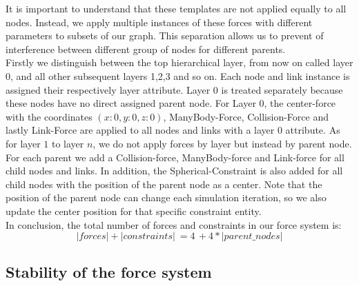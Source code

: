 It is important to understand that these templates are not applied equally to all nodes. Instead, we apply multiple instances of these forces with different parameters to subsets of our graph. 
This separation allows us to prevent of interference between different group of nodes for different parents.\\ 
Firstly we distinguish between the top hierarchical layer, from now on called layer $0$, and all other subsequent layers 1,2,3 and so on. Each node and link instance is assigned their respectively layer attribute. Layer $0$ is treated separately because these nodes have no direct assigned parent node. 
For Layer $0$, the center-force with the coordinates $(x:0,y:0,z:0)$, ManyBody-Force, Collision-Force and lastly Link-Force are applied to all nodes and links with a layer $0$ attribute. 
As for layer $1$ to layer $n$, we do not apply forces by layer but instead by parent node. For each parent we add a Collision-force, ManyBody-force and Link-force for all child nodes and links. In addition, the Spherical-Constraint is also added for all child nodes with the position of the parent node as a center. Note that the position of the parent node can change each simulation iteration, so we also update the center position for that specific constraint entity.\\
In conclusion, the total number of forces and constraints in our force system is: 
\begin{equation}
    |forces| + |constraints| \: = 4 \, + 4 * |parent\_nodes|
\end{equation}

\subsection{Stability of the force system}

